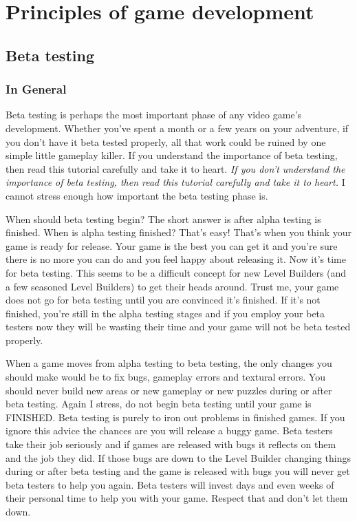 \part{Principles of game development}
\chapter{Beta testing}
\section{In General}

Beta testing is perhaps the most important phase of any video game's development. Whether you've spent a month or a few years on your adventure, if you don't have it beta tested properly, all that work could be ruined by one simple little gameplay killer. If you understand the importance of beta testing, then read this tutorial carefully and take it to heart. \emph{If you don't understand the importance of beta testing, then read this tutorial carefully and take it to heart.} I cannot stress enough how important the beta testing phase is.
\par When should beta testing begin? The short answer is after alpha testing is finished. When is alpha testing finished? That's easy! That's when you think your game is ready for release. Your game is the best you can get it and you're sure there is no more you can do and you feel happy about releasing it. Now it's time for beta testing. This seems to be a difficult concept for new Level Builders (and a few seasoned Level Builders) to get their heads around. Trust me, your game does not go for beta testing until you are convinced it's finished. If it's not finished, you're still in the alpha testing stages and if you employ your beta testers now they will be wasting their time and your game will not be beta tested properly.
\par When a game moves from alpha testing to beta testing, the only changes you should make would be to fix bugs, gameplay errors and textural errors. You should never build new areas or new gameplay or new puzzles during or after beta testing. Again I stress, do not begin beta testing until your game is FINISHED. Beta testing is purely to iron out problems in finished games. If you ignore this advice the chances are you will release a buggy game. Beta testers take their job seriously and if games are released with bugs it reflects on them and the job they did. If those bugs are down to the Level Builder changing things during or after beta testing and the game is released with bugs you will never get beta testers to help you again. Beta testers will invest days and even weeks of their personal time to help you with your game. Respect that and don't let them down.

